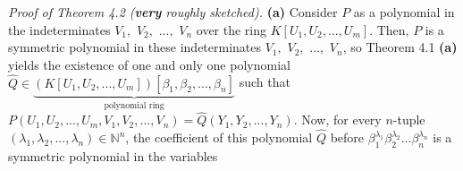 \documentclass[numbers=enddot,12pt,final,onecolumn,notitlepage]{scrartcl}%
\begin{document}
\textit{Proof of Theorem 4.2 (\textbf{very} roughly sketched).} \textbf{(a)}
Consider $P$ as a polynomial in the indeterminates $V_{1},$ $V_{2},$ $...,$
$V_{n}$ over the ring $K\left[  U_{1},U_{2},...,U_{m}\right]  $. Then, $P$ is
a symmetric polynomial in these indeterminates $V_{1},$ $V_{2},$ $...,$
$V_{n}$, so Theorem 4.1 \textbf{(a)} yields the existence of one and only one
polynomial $\widehat{Q}\in\underbrace{\left(  K\left[  U_{1},U_{2}%
,...,U_{m}\right]  \right)  \left[  \beta_{1},\beta_{2},...,\beta_{n}\right]
}_{\text{polynomial ring}}$ such that $P\left(  U_{1},U_{2},...,U_{m}%
,V_{1},V_{2},...,V_{n}\right)  =\widehat{Q}\left(  Y_{1},Y_{2},...,Y_{n}%
\right)  $. Now, for every $n$-tuple $\left(  \lambda_{1},\lambda
_{2},...,\lambda_{n}\right)  \in\mathbb{N}^{n}$, the coefficient of this
polynomial $\widehat{Q}$ before $\beta_{1}^{\lambda_{1}}\beta_{2}^{\lambda
_{2}}...\beta_{n}^{\lambda_{n}}$ is a symmetric polynomial in the variables
\end{document}
